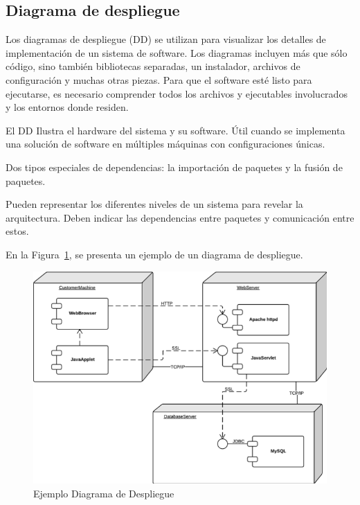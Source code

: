    \subsection{Diagrama de despliegue}\label{ssc:diagDesp}
    Los diagramas de despliegue (DD) se utilizan para visualizar los detalles de implementación de un sistema de software. Los diagramas incluyen más que sólo código, sino también bibliotecas separadas, un instalador, archivos de configuración y muchas otras piezas. Para que el software esté listo para ejecutarse, es necesario comprender todos los archivos y ejecutables involucrados y los entornos donde residen.

    El DD Ilustra el hardware del sistema y su software. Útil cuando se implementa una solución de software en múltiples máquinas con configuraciones únicas.

    Dos tipos especiales de dependencias: la importación de paquetes y la fusión de paquetes.

    Pueden representar los diferentes niveles de un sistema para revelar la arquitectura. Deben indicar las dependencias entre paquetes y comunicación entre estos.

    En la Figura~\ref{fig:DD}, se presenta un ejemplo de un diagrama de despliegue.

    \begin{figure}[H]
        \centering
        \includegraphics{imagenes/DD.png}
        \caption{Ejemplo Diagrama de Despliegue}
        \label{fig:DD}
    \end{figure}




